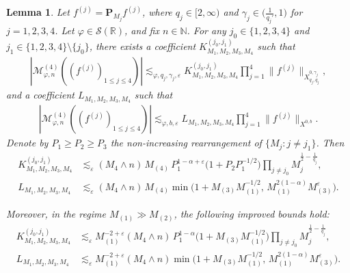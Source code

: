 \documentclass[11pt,reqno,english]{amsart}
\numberwithin{equation}{section}
\theoremstyle{plain}
\newtheorem{lemma}[theorem]{Lemma}
\theoremstyle{definition}
\theoremstyle{remark}
\newcommand{\R}{\mathbb{R}}
\newcommand{\N}{\mathbb{N}}
\begin{document}
\begin{lemma}\label{4-linear}
	Let $f^{(j)}=\mathbf{P}_{M_j}f^{(j)}$, where $q_j\in[2,\infty)$ and $\gamma_j\in\big(\frac1{q_j'},1\big)$ for $j=1,2,3,4$.
	Let $\varphi\in\mathcal{S}(\R)$, and fix $n\in\N$. For any $j_0\in\{1,2,3,4\}$ and $j_1\in\{1,2,3,4\}\setminus\{j_0\}$, there exists a coefficient $K_{M_1,M_2,M_3,M_4}^{(j_0,j_1)}$ such that
	\begin{align}\label{eq1:4-linear}
		|\mathcal{M}_{\varphi,n}^{(4)}((f^{(j)})_{1\leq j\leq 4})|
		\lesssim_{\varphi,q_j,\gamma_j,\varepsilon}
		K_{M_1,M_2,M_3,M_4}^{(j_0,j_1)}
		\prod_{j=1}^4\|f^{(j)}\|_{X_{q_j,q_j}^{0,\gamma_j}},
	\end{align}
	and a coefficient $L_{M_1,M_2,M_3,M_4}$ such that
	\begin{align}\label{eq2:4-linear}
		|\mathcal{M}_{\varphi,n}^{(4)}((f^{(j)})_{1\leq j\leq 4})|
		\lesssim_{\varphi,b,\varepsilon}
		L_{M_1,M_2,M_3,M_4}\prod_{j=1}^4\|f^{(j)}\|_{X^{0,b}}.
	\end{align}
	Denote by $P_1\geq P_2\geq P_3$ the non-increasing rearrangement of $\{M_j:j\neq j_1\}$.
	Then
	\begin{align*}
		K_{M_1,M_2,M_3,M_4}^{(j_0,j_1)}
		&\lesssim_{\varepsilon}
		(M_4\wedge n)\,M_{(4)}\,P_1^{1-\alpha+\varepsilon}
		\Big(1+P_2 P_1^{-1/2}\Big)
		\prod_{j\neq j_0}M_j^{\frac12-\frac1{q_j}},\\
		L_{M_1,M_2,M_3,M_4}
		&\lesssim_{\varepsilon}
		(M_4\wedge n)\,M_{(4)}
		\min\Big(1+M_{(3)}M_{(1)}^{-1/2},\, M_{(1)}^{2(1-\alpha)}M_{(3)}^{\varepsilon}\Big).
	\end{align*}

	Moreover, in the regime $M_{(1)}\gg M_{(2)}$, the following improved bounds hold:
	\begin{align*}
		K_{M_1,M_2,M_3,M_4}^{(j_0,j_1)}
		&\lesssim_{\varepsilon}
		M_{(1)}^{-2+\varepsilon}(M_4\wedge n)\,P_1^{1-\alpha}
		\Big(1+M_{(3)}M_{(1)}^{-1/2}\Big)
		\prod_{j\neq j_0}M_j^{\frac12-\frac1{q_j}},\\
		L_{M_1,M_2,M_3,M_4}
		&\lesssim_{\varepsilon}
		M_{(1)}^{-2+\varepsilon}(M_4\wedge n)
		\min\Big(1+M_{(3)}M_{(1)}^{-1/2},\, M_{(1)}^{2(1-\alpha)}M_{(3)}^{\varepsilon}\Big).
	\end{align*}
\end{lemma}
\end{document}
